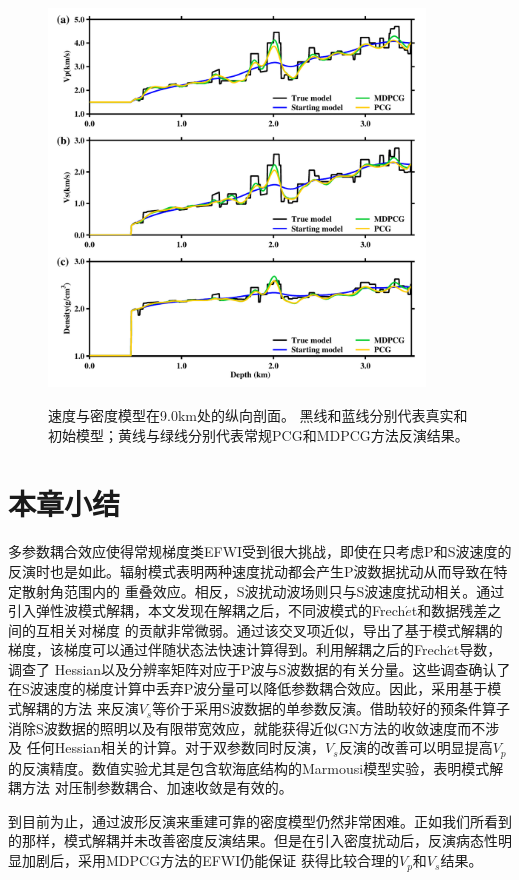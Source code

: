 \begin{figure}
    \begin{center}
        {\includegraphics[width=10cm]{Figure/chapter02/tariqsugresult/Fig/9kmrho.pdf}}
        \caption{
			速度与密度模型在9.0km处的纵向剖面。
			黑线和蓝线分别代表真实和初始模型；黄线与绿线分别代表常规PCG和MDPCG方法反演结果。
    }
    \label{fig:RhoProfile9km}
    \end{center}
\end{figure} 

\section{本章小结}
多参数耦合效应使得常规梯度类EFWI受到很大挑战，即使在只考虑P和S波速度的反演时也是如此。辐射模式表明两种速度扰动都会产生P波数据扰动从而导致在特定散射角范围内的
重叠效应。相反，S波扰动波场则只与S波速度扰动相关。通过引入弹性波模式解耦，本文发现在解耦之后，不同波模式的Frech{$\acute{e}$}t和数据残差之间的互相关对梯度
的贡献非常微弱。通过该交叉项近似，导出了基于模式解耦的梯度，该梯度可以通过伴随状态法快速计算得到。利用解耦之后的Frech{$\acute{e}$}t导数，调查了
Hessian以及分辨率矩阵对应于P波与S波数据的有关分量。这些调查确认了在S波速度的梯度计算中丢弃P波分量可以降低参数耦合效应。因此，采用基于模式解耦的方法
来反演$V_s$等价于采用S波数据的单参数反演。借助较好的预条件算子消除S波数据的照明以及有限带宽效应，就能获得近似GN方法的收敛速度而不涉及
任何Hessian相关的计算。对于双参数同时反演，$V_s$反演的改善可以明显提高$V_p$的反演精度。数值实验尤其是包含软海底结构的Marmousi模型实验，表明模式解耦方法
对压制参数耦合、加速收敛是有效的。

到目前为止，通过波形反演来重建可靠的密度模型仍然非常困难。正如我们所看到的那样，模式解耦并未改善密度反演结果。但是在引入密度扰动后，反演病态性明显加剧后，采用MDPCG方法的EFWI仍能保证
获得比较合理的$V_p$和$V_s$结果。
